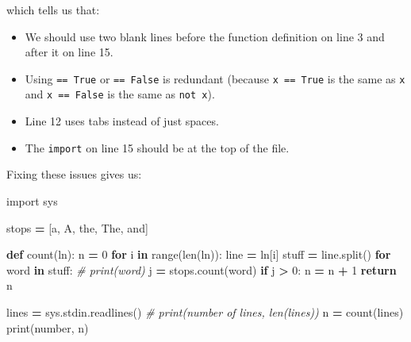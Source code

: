 \documentclass[
]{krantz}
\makeatletter
\newenvironment{Shaded}{\begin{snugshade}}{\end{snugshade}}
\newcommand{\BuiltInTok}[1]{#1}
\newcommand{\CommentTok}[1]{\textcolor[rgb]{0.56,0.35,0.01}{\textit{#1}}}
\newcommand{\ControlFlowTok}[1]{\textcolor[rgb]{0.13,0.29,0.53}{\textbf{#1}}}
\newcommand{\DecValTok}[1]{\textcolor[rgb]{0.00,0.00,0.81}{#1}}
\newcommand{\ImportTok}[1]{#1}
\newcommand{\KeywordTok}[1]{\textcolor[rgb]{0.13,0.29,0.53}{\textbf{#1}}}
\newcommand{\NormalTok}[1]{#1}
\newcommand{\OperatorTok}[1]{\textcolor[rgb]{0.81,0.36,0.00}{\textbf{#1}}}
\newcommand{\StringTok}[1]{\textcolor[rgb]{0.31,0.60,0.02}{#1}}
\providecommand{\tightlist}{%
  \setlength{\itemsep}{0pt}\setlength{\parskip}{0pt}}
\newenvironment{kframe}{%
\medskip{}
\setlength{\fboxsep}{.8em}
 \def\at@end@of@kframe{}%
 \ifinner\ifhmode%
  \def\at@end@of@kframe{\end{minipage}}%
  \begin{minipage}{\columnwidth}%
 \fi\fi%
 \def\FrameCommand##1{\hskip\@totalleftmargin \hskip-\fboxsep
 \colorbox{shadecolor}{##1}\hskip-\fboxsep
     \hskip-\linewidth \hskip-\@totalleftmargin \hskip\columnwidth}%
 \MakeFramed {\advance\hsize-\width
   \@totalleftmargin\z@ \linewidth\hsize
   \@setminipage}}%
 {\par\unskip\endMakeFramed%
 \at@end@of@kframe}
\renewenvironment{Shaded}{\begin{kframe}}{\end{kframe}}
\makeatother
\begin{document}
which tells us that:

\begin{itemize}
\tightlist
\item
  We should use two blank lines before the function definition on line 3
  and after it on line 15.
\item
  Using \texttt{==\ True} or \texttt{==\ False} is redundant
  (because \texttt{x\ ==\ True} is the same as \texttt{x}
  and \texttt{x\ ==\ False} is the same as \texttt{not\ x}).
\item
  Line 12 uses tabs instead of just spaces.
\item
  The \texttt{import} on line 15 should be at the top of the file.
\end{itemize}

Fixing these issues gives us:

\begin{Shaded}
\begin{Highlighting}[]
\ImportTok{import}\NormalTok{ sys}


\NormalTok{stops }\OperatorTok{=}\NormalTok{ [}\StringTok{\textquotesingle{}a\textquotesingle{}}\NormalTok{, }\StringTok{\textquotesingle{}A\textquotesingle{}}\NormalTok{, }\StringTok{\textquotesingle{}the\textquotesingle{}}\NormalTok{, }\StringTok{\textquotesingle{}The\textquotesingle{}}\NormalTok{, }\StringTok{\textquotesingle{}and\textquotesingle{}}\NormalTok{]}


\KeywordTok{def}\NormalTok{ count(ln):}
\NormalTok{    n }\OperatorTok{=} \DecValTok{0}
    \ControlFlowTok{for}\NormalTok{ i }\KeywordTok{in} \BuiltInTok{range}\NormalTok{(}\BuiltInTok{len}\NormalTok{(ln)):}
\NormalTok{        line }\OperatorTok{=}\NormalTok{ ln[i]}
\NormalTok{        stuff }\OperatorTok{=}\NormalTok{ line.split()}
        \ControlFlowTok{for}\NormalTok{ word }\KeywordTok{in}\NormalTok{ stuff:}
            \CommentTok{\# print(word)}
\NormalTok{            j }\OperatorTok{=}\NormalTok{ stops.count(word)}
            \ControlFlowTok{if}\NormalTok{ j }\OperatorTok{\textgreater{}} \DecValTok{0}\NormalTok{:}
\NormalTok{                n }\OperatorTok{=}\NormalTok{ n }\OperatorTok{+} \DecValTok{1}
    \ControlFlowTok{return}\NormalTok{ n}


\NormalTok{lines }\OperatorTok{=}\NormalTok{ sys.stdin.readlines()}
\CommentTok{\# print(\textquotesingle{}number of lines\textquotesingle{}, len(lines))}
\NormalTok{n }\OperatorTok{=}\NormalTok{ count(lines)}
\BuiltInTok{print}\NormalTok{(}\StringTok{\textquotesingle{}number\textquotesingle{}}\NormalTok{, n)}
\end{Highlighting}
\end{Shaded}
\end{document}
